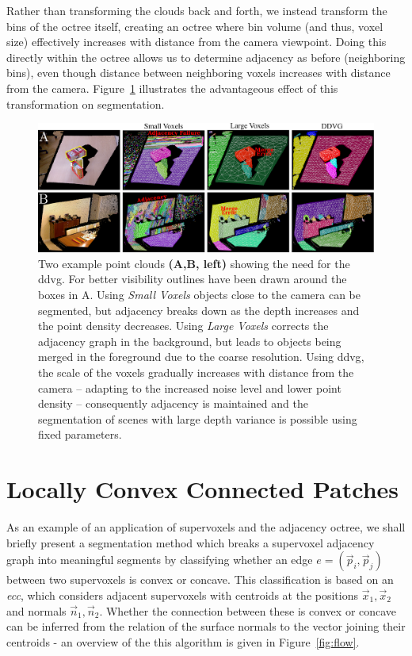 Rather than transforming the clouds back and forth, we instead transform the bins of the octree itself, creating an octree where bin volume (and thus, voxel size) effectively increases with distance from the camera viewpoint. Doing this directly within the octree allows us to determine adjacency as before (neighboring bins), even though distance between neighboring voxels increases with distance from the camera. Figure~\ref{fig:quantization_transform} illustrates the advantageous effect of this transformation on segmentation.

\begin{figure}
  \centering
  \includegraphics[width = \linewidth]{figures/CVPR2014/transform_results_v2}
\caption[Depth Adaptive Transform]{Two example point clouds \textbf{(A,B, left)} showing the need for the \gls{ddvg}. For better visibility outlines have been drawn around the boxes in A. Using \textit{Small Voxels} objects close to the camera can be segmented, but adjacency breaks down as the depth increases and the point density decreases. Using \textit{Large Voxels} corrects the adjacency graph in the background, but leads to objects being merged in the foreground due to the coarse resolution. Using \gls{ddvg}, the scale of the voxels gradually increases with distance from the camera -- adapting to the increased noise level and lower point density -- consequently adjacency is maintained and the segmentation of scenes with large depth variance is possible using fixed parameters. }
\label{fig:quantization_transform}
\end{figure}


\section{Locally Convex Connected Patches}
As an example of an application of supervoxels and the adjacency octree, we shall briefly present a segmentation method which breaks a supervoxel adjacency graph into meaningful segments by classifying whether an edge $e=(\vec p_i, \vec p_j)$ between two supervoxels is convex or concave. This classification is based on an \emph{\gls{ecc}}, which considers adjacent supervoxels with centroids at the positions $\vec x_1,\vec x_2$ and normals $\vec n_1, \vec n_2$. Whether the connection between these is convex or concave can be inferred from the relation of the surface normals to the vector joining their centroids - an overview of the this algorithm is given in Figure~\ref{fig:flow}.

